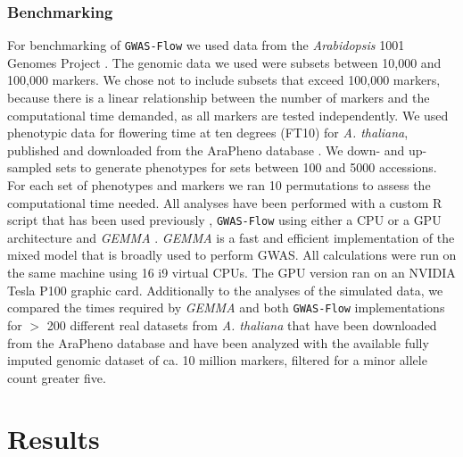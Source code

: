 \subsubsection{Benchmarking}
For benchmarking of \texttt{GWAS-Flow} we used data from the \textit{Arabidopsis} 1001 Genomes Project \cite{1001genome}. The genomic data we used were subsets between 10,000 and 100,000 markers. We chose not to include subsets that exceed 100,000 markers, because there is a linear relationship between the number of markers and the computational time demanded, as all markers are tested independently. We used phenotypic data for flowering time at ten degrees (FT10) for \textit{A. thaliana}, published and downloaded from the AraPheno database \cite{seren2016arapheno}. We down- and up-sampled sets to generate phenotypes for sets between 100 and 5000 accessions.
For each set of phenotypes and markers we ran 10 permutations to assess the computational time needed. All analyses have been performed with a custom R script that has been used previously \cite{togninalli2017aragwas}, \texttt{GWAS-Flow} using either a CPU or a GPU architecture and \textit{GEMMA} \cite{Zhou2012}. \textit{GEMMA} is a fast and efficient implementation of the mixed model that is broadly used to perform GWAS.
All calculations were run on the same machine using 16 i9 virtual CPUs. The GPU version ran on an NVIDIA Tesla P100 graphic card.
Additionally to the analyses of the simulated data, we compared the times required by \textit{GEMMA} and both \texttt{GWAS-Flow} implementations for $>$ 200 different real datasets from \textit{A. thaliana} that have been downloaded from the AraPheno \cite{seren2016arapheno} database and have been analyzed with the available fully imputed genomic dataset of ca. 10 million markers, filtered for a minor allele count greater five. 

\section{Results}


